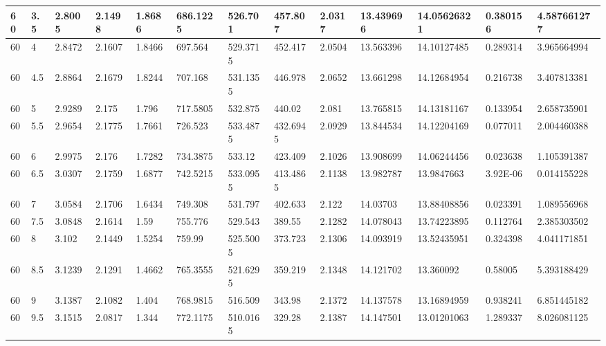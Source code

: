 \begin{longtable}{|l|l|l|l|l|l|l|l|l|l|l|l|l|}
60    & 3.5   & 2.8005  & 2.1498  & 1.8686  & 686.1225 & 526.701  & 457.807  & 2.0317   & 13.439696   & 14.05626321    & 0.380156                 & 4.587661277 \\ \hline
60    & 4     & 2.8472  & 2.1607  & 1.8466  & 697.564  & 529.3715 & 452.417  & 2.0504   & 13.563396   & 14.10127485    & 0.289314                 & 3.965664994 \\ \hline
60    & 4.5   & 2.8864  & 2.1679  & 1.8244  & 707.168  & 531.1355 & 446.978  & 2.0652   & 13.661298   & 14.12684954    & 0.216738                 & 3.407813381 \\ \hline
60    & 5     & 2.9289  & 2.175   & 1.796   & 717.5805 & 532.875  & 440.02   & 2.081    & 13.765815   & 14.13181167    & 0.133954                 & 2.658735901 \\ \hline
60    & 5.5   & 2.9654  & 2.1775  & 1.7661  & 726.523  & 533.4875 & 432.6945 & 2.0929   & 13.844534   & 14.12204169    & 0.077011                 & 2.004460388 \\ \hline
60    & 6     & 2.9975  & 2.176   & 1.7282  & 734.3875 & 533.12   & 423.409  & 2.1026   & 13.908699   & 14.06244456    & 0.023638                 & 1.105391387 \\ \hline
60    & 6.5   & 3.0307  & 2.1759  & 1.6877  & 742.5215 & 533.0955 & 413.4865 & 2.1138   & 13.982787   & 13.9847663     & 3.92E-06                 & 0.014155228 \\ \hline
60    & 7     & 3.0584  & 2.1706  & 1.6434  & 749.308  & 531.797  & 402.633  & 2.122    & 14.03703    & 13.88408856    & 0.023391                 & 1.089556968 \\ \hline
60    & 7.5   & 3.0848  & 2.1614  & 1.59    & 755.776  & 529.543  & 389.55   & 2.1282   & 14.078043   & 13.74223895    & 0.112764                 & 2.385303502 \\ \hline
60    & 8     & 3.102   & 2.1449  & 1.5254  & 759.99   & 525.5005 & 373.723  & 2.1306   & 14.093919   & 13.52435951    & 0.324398                 & 4.041171851 \\ \hline
60    & 8.5   & 3.1239  & 2.1291  & 1.4662  & 765.3555 & 521.6295 & 359.219  & 2.1348   & 14.121702   & 13.360092      & 0.58005                  & 5.393188429 \\ \hline
60    & 9     & 3.1387  & 2.1082  & 1.404   & 768.9815 & 516.509  & 343.98   & 2.1372   & 14.137578   & 13.16894959    & 0.938241                 & 6.851445182 \\ \hline
60    & 9.5   & 3.1515  & 2.0817  & 1.344   & 772.1175 & 510.0165 & 329.28   & 2.1387   & 14.147501   & 13.01201063    & 1.289337                 & 8.026081125 \\ \hline

\end{longtable}
